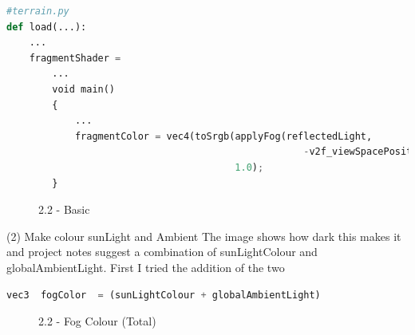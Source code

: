 \documentclass[a4 paper, 12pt]{article}
\begin{document}
\begin{lstlisting}[language=python]
#terrain.py
def load(...):
    ...
    fragmentShader = 
        ...
        void main()
        {
            ...
            fragmentColor = vec4(toSrgb(applyFog(reflectedLight, 
                                                    -v2f_viewSpacePosition.z)), 
                                        1.0);
        }
\end{lstlisting} 

\begin{figure} [H]
    \caption{2.2 - Basic}   
\end{figure}


(2) Make colour sunLight and Ambient
The image shows how dark this makes it and project notes suggest a combination of sunLightColour and globalAmbientLight. First I tried the addition of the two
\begin{lstlisting}[language=python]
    vec3  fogColor  = (sunLightColour + globalAmbientLight)
\end{lstlisting} 

\begin{figure} [H]
    \caption{2.2 - Fog Colour (Total)}   
\end{figure}
\end{document}
